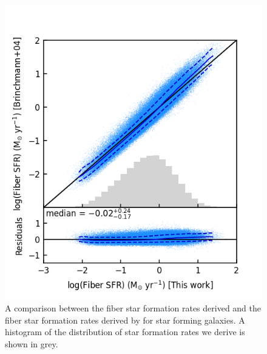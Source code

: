 \documentclass[fleqn,usenatbib]{mnras}
\begin{document}
\begin{figure}
    \centering
    \includegraphics[width=\columnwidth]{figures/fig3.png}
    \caption{A comparison between the fiber star formation rates derived and the fiber star formation rates derived by \protect \cite{brinchmann2004} for star forming galaxies. A histogram of the distribution of star formation rates we derive is shown in grey.}
    \label{fig:model_SFR_vs_brinchmann04}
\end{figure}
\end{document}
